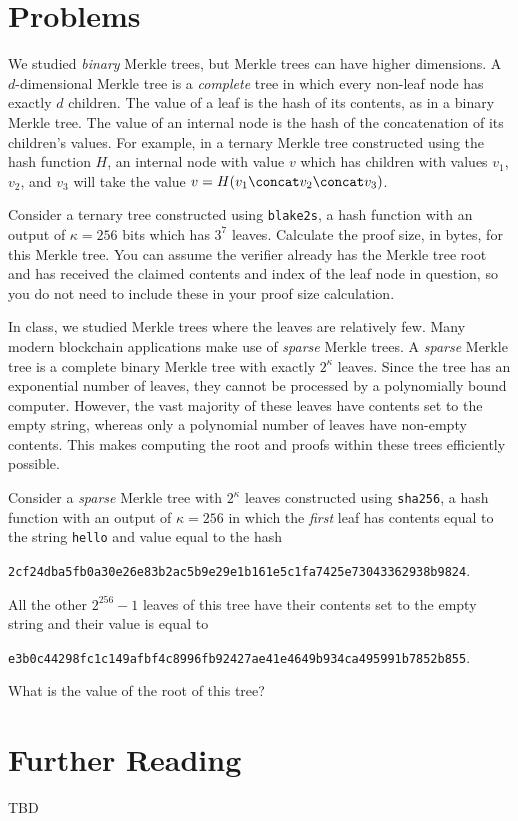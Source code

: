 \section*{Problems}

\begin{problems}
    \item We studied \emph{binary} Merkle trees, but Merkle trees can have
          higher dimensions. A $d$-dimensional Merkle tree is a \emph{complete}
          tree in which every non-leaf node has exactly $d$ children. The value
          of a leaf is the hash of its contents, as in a binary Merkle tree. The
          value of an internal node is the hash of the concatenation of its
          children's values. For example, in a ternary Merkle tree constructed
          using the hash function $H$, an internal node with value $v$ which has
          children with values $v_1$, $v_2$, and $v_3$ will take the value
          $v = H(v_1 \concat v_2 \concat v_3)$.

          Consider a ternary tree constructed using \texttt{blake2s}, a hash
          function with an output of $\kappa = 256$ bits which has $3^7$ leaves.
          Calculate the proof size, in bytes, for this Merkle tree. You can
          assume the verifier already has the Merkle tree root and has received
          the claimed contents and index of the leaf node in question, so you do
          not need to include these in your proof size calculation.

    \item In class, we studied Merkle trees where the leaves are relatively few.
          Many modern blockchain applications make use of \emph{sparse} Merkle
          trees. A \emph{sparse} Merkle tree is a complete binary Merkle tree
          with exactly $2^\kappa$ leaves. Since the tree has an exponential
          number of leaves, they cannot be processed by a polynomially bound
          computer. However, the vast majority of these leaves have contents set
          to the empty string, whereas only a polynomial number of leaves have
          non-empty contents. This makes computing the root and proofs within
          these trees efficiently possible.

          Consider a \emph{sparse} Merkle tree with $2^\kappa$ leaves
          constructed using \texttt{sha256}, a hash function with an output of
          $\kappa = 256$ in which the \emph{first} leaf has contents equal to
          the string \texttt{hello} and value equal to the hash

          \texttt{2cf24dba5fb0a30e26e83b2ac5b9e29e1b161e5c1fa7425e73043362938b9824}.

          All the other $2^{256} - 1$ leaves of this tree have their contents
          set to the empty string and their value is equal to

          \texttt{e3b0c44298fc1c149afbf4c8996fb92427ae41e4649b934ca495991b7852b855}.

          What is the value of the root of this tree?
\end{problems}

\section*{Further Reading}

TBD
